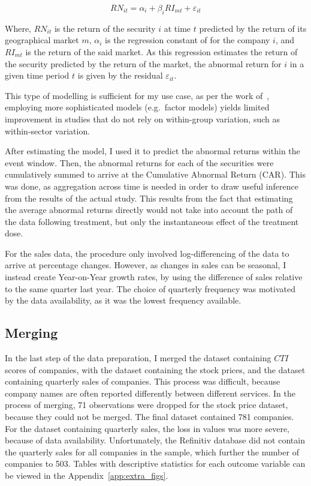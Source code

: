 \documentclass[12pt]{article}
\begin{document}
\begin{equation}\label{eq:reg_market_model}
    RN_{it} = \alpha_i + \beta_{i} RI_{mt} + \varepsilon_{it}
\end{equation}

Where, $RN_{it}$ is the return of the security $i$ at time $t$ predicted by the return of its geographical market $m$, $\alpha_i$ is the regression constant of for the company $i$, and $RI_{mt}$ is the return of the said market. As this regression estimates the return of the security predicted by the return of the market, the abnormal return for $i$ in a given time period $t$ is given by the residual $\varepsilon_{it}$.

This type of modelling is sufficient for my use case, as per the work of~\textcite{mackinlayEventStudiesEconomics1997}, employing more sophisticated models (e.g.~factor models) yields limited improvement in studies that do not rely on within-group variation, such as within-sector variation.

After estimating the model, I used it to predict the abnormal returns within the event window. Then, the abnormal returns for each of the securities were cumulatively summed to arrive at the Cumulative Abnormal Return (CAR). This was done, as aggregation across time is needed in order to draw useful inference from the results of the actual study. This results from the fact that estimating the average abnormal returns directly would not take into account the path of the data following treatment, but only the instantaneous effect of the treatment dose.

For the sales data, the procedure only involved log-differencing of the data to arrive at percentage changes. However, as changes in sales can be seasonal, I instead create Year-on-Year growth rates, by using the difference of sales relative to the same quarter last year. The choice of quarterly frequency was motivated by the data availability, as it was the lowest frequency available. 


\subsection{Merging}

In the last step of the data preparation, I merged the dataset containing $CTI$ scores of companies, with the dataset containing the stock prices, and the dataset containing quarterly sales of companies. This process was difficult, because company names are often reported differently between different services. In the process of merging, 71 observations were dropped for the stock price dataset, because they could not be merged. The final dataset contained 781 companies. For the dataset containing quarterly sales, the loss in values was more severe, because of data availability. Unfortunately, the Refinitiv database did not contain the quarterly sales for all companies in the sample, which further the number of companies to 503. Tables with descriptive statistics for each outcome variable can be viewed in the Appendix~\ref{app:extra_figs}.
\end{document}
